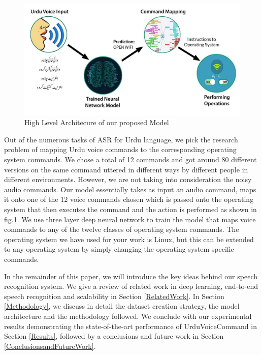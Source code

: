 \documentclass[conference]{IEEEtran}
\begin{document}
\begin{figure}[h!]
  \includegraphics[width=\linewidth]{figure-UrduArchitecture.jpg}
  \caption{High Level Architecure of our proposed Model}
  \label{fig:figure-UrduArchitecture}
\end{figure} 

Out of the numerous tasks of ASR for Urdu language, we pick the research problem of mapping Urdu voice commands to the corresponding operating system commands. We chose a total of 12 commands and got around 80 different versions on the same command uttered in different ways by different people in different environments. However, we are not taking into consideration the noisy audio commands. Our model essentially takes as input an audio command, maps it onto one of the 12 voice commands chosen which is passed onto the operating system that then executes the command and the action is performed as shown in fig.\ref{fig:figure-UrduArchitecture}. We use three layer deep neural network to train the model that maps voice commands to any of the twelve classes of operating system commands. The operating system we have used for your work is Linux, but this can be extended to any operating system by simply changing the operating system specific commands.  

In the remainder of this paper, we will introduce the key ideas behind our speech recognition system. We give a review of related work in deep learning, end-to-end speech recognition and scalability in Section \ref{RelatedWork}. In Section \ref{Methodology}, we discuss in detail the dataset creation strategy, the model architecture and the methodology followed. We conclude with our experimental results demonstrating the state-of-the-art performance of UrduVoiceCommand in Section \ref{Results}, followed by a conclusions and future work in Section \ref{ConclusionsandFutureWork}.
\end{document}
